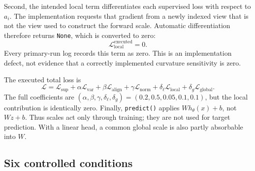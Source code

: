 \documentclass[10pt]{article}
\begin{document}
Second, the intended local term differentiates each supervised loss with
respect to $a_i$. The implementation requests that gradient from a newly
indexed view that is not the view used to construct the forward scale.
Automatic differentiation therefore returns \texttt{None}, which is converted
to zero:
\begin{equation}
\mathcal L_{\mathrm{local}}^{\mathrm{executed}}=0.
\end{equation}
Every primary-run log records this term as zero. This is an implementation
defect, not evidence that a correctly implemented curvature sensitivity is
zero.

The executed total loss is
\begin{equation}
\mathcal L=
\mathcal L_{\mathrm{sup}}
+\alpha\mathcal L_{\mathrm{var}}
+\beta\mathcal L_{\mathrm{align}}
+\gamma\mathcal L_{\mathrm{norm}}
+\delta_\ell\mathcal L_{\mathrm{local}}
+\delta_g\mathcal L_{\mathrm{global}} .
\label{eq:objective}
\end{equation}
The full coefficients are
$(\alpha,\beta,\gamma,\delta_\ell,\delta_g)
=(0.2,0.5,0.05,0.1,0.1)$, but the local contribution is identically zero.
Finally, \texttt{predict()} applies $Wh_\theta(x)+b$, not
$Wz+b$. Thus scales act only through training; they are not used for target
prediction. With a linear head, a common global scale is also partly
absorbable into $W$.

\subsection{Six controlled conditions}
\label{sec:conditions}
\end{document}
